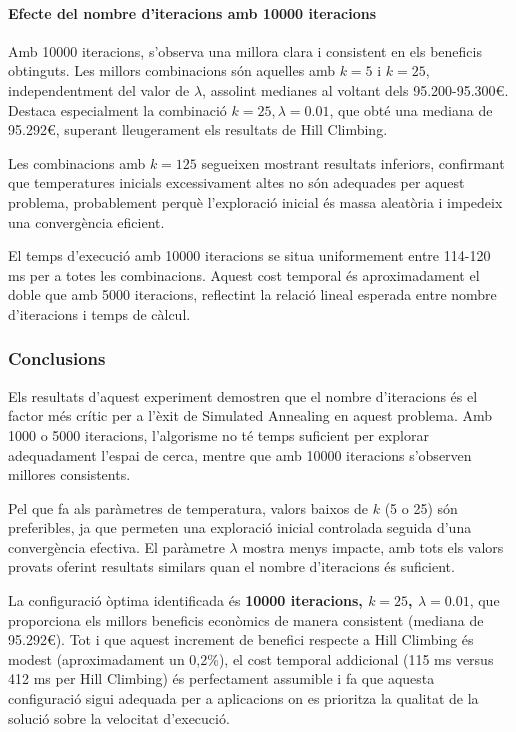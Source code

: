 \paragraph{Efecte del nombre d'iteracions amb 10000 iteracions}

\vspace{0.5cm}

\vspace{0.5cm}

Amb 10000 iteracions, s'observa una millora clara i consistent en els beneficis obtinguts. Les millors combinacions són aquelles amb $k=5$ i $k=25$, independentment del valor de $\lambda$, assolint medianes al voltant dels 95.200-95.300€. Destaca especialment la combinació $k=25, \lambda=0.01$, que obté una mediana de 95.292€, superant lleugerament els resultats de Hill Climbing.

Les combinacions amb $k=125$ segueixen mostrant resultats inferiors, confirmant que temperatures inicials excessivament altes no són adequades per aquest problema, probablement perquè l'exploració inicial és massa aleatòria i impedeix una convergència eficient.

\vspace{0.5cm}

\vspace{0.5cm}

El temps d'execució amb 10000 iteracions se situa uniformement entre 114-120 ms per a totes les combinacions. Aquest cost temporal és aproximadament el doble que amb 5000 iteracions, reflectint la relació lineal esperada entre nombre d'iteracions i temps de càlcul.

\vspace{0.5cm}


\subsubsection{Conclusions}

Els resultats d'aquest experiment demostren que el nombre d'iteracions és el factor més crític per a l'èxit de Simulated Annealing en aquest problema. Amb 1000 o 5000 iteracions, l'algorisme no té temps suficient per explorar adequadament l'espai de cerca, mentre que amb 10000 iteracions s'observen millores consistents.

Pel que fa als paràmetres de temperatura, valors baixos de $k$ (5 o 25) són preferibles, ja que permeten una exploració inicial controlada seguida d'una convergència efectiva. El paràmetre $\lambda$ mostra menys impacte, amb tots els valors provats oferint resultats similars quan el nombre d'iteracions és suficient.

La configuració òptima identificada és \textbf{10000 iteracions, $k=25$, $\lambda=0.01$}, que proporciona els millors beneficis econòmics de manera consistent (mediana de 95.292€). Tot i que aquest increment de benefici respecte a Hill Climbing és modest (aproximadament un 0,2\%), el cost temporal addicional (115 ms versus 412 ms per Hill Climbing) és perfectament assumible i fa que aquesta configuració sigui adequada per a aplicacions on es prioritza la qualitat de la solució sobre la velocitat d'execució.